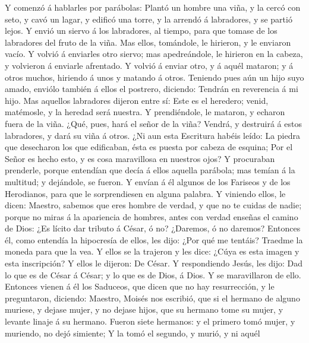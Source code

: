  Y comenzó á hablarles por parábolas: Plantó un hombre una
viña, y la cercó con seto, y cavó un lagar, y edificó una torre, y la
arrendó á labradores, y se partió lejos.  Y envió un
siervo á los labradores, al tiempo, para que tomase de los labradores
del fruto de la viña.  Mas ellos, tomándole, le hirieron,
y le enviaron vacío.  Y volvió á enviarles otro siervo;
mas apedreándole, le hirieron en la cabeza, y volvieron á enviarle
afrentado.  Y volvió á enviar otro, y á aquél mataron; y á
otros muchos, hiriendo á unos y matando á otros.  Teniendo
pues aún un hijo suyo amado, enviólo también á ellos el postrero,
diciendo: Tendrán en reverencia á mi hijo.  Mas aquellos
labradores dijeron entre sí: Este es el heredero; venid, matémosle, y la
heredad será nuestra.  Y prendiéndole, le mataron, y
echaron fuera de la viña.  ¿Qué, pues, hará el señor de la
viña? Vendrá, y destruirá á estos labradores, y dará su viña á otros.
 ¿Ni aun esta Escritura habéis leído: La piedra que
desecharon los que edificaban, ésta es puesta por cabeza de esquina;
 Por el Señor es hecho esto, y es cosa maravillosa en
nuestros ojos?  Y procuraban prenderle, porque entendían
que decía á ellos aquella parábola; mas temían á la multitud; y
dejándole, se fueron.  Y envían á él algunos de los
Fariseos y de los Herodianos, para que le sorprendiesen en alguna
palabra.  Y viniendo ellos, le dicen: Maestro, sabemos
que eres hombre de verdad, y que no te cuidas de nadie; porque no miras
á la apariencia de hombres, antes con verdad enseñas el camino de Dios:
¿Es lícito dar tributo á César, ó no? ¿Daremos, ó no daremos?
 Entonces él, como entendía la hipocresía de ellos, les
dijo: ¿Por qué me tentáis? Traedme la moneda para que la vea.
 Y ellos se la trajeron y les dice: ¿Cúya es esta imagen
y esta inscripción? Y ellos le dijeron: De César.  Y
respondiendo Jesús, les dijo: Dad lo que es de César á César; y lo que
es de Dios, á Dios. Y se maravillaron de ello.  Entonces
vienen á él los Saduceos, que dicen que no hay resurrección, y le
preguntaron, diciendo:  Maestro, Moisés nos escribió, que
si el hermano de alguno muriese, y dejase mujer, y no dejase hijos, que
su hermano tome su mujer, y levante linaje á su hermano. 
Fueron siete hermanos: y el primero tomó mujer, y muriendo, no dejó
simiente;  Y la tomó el segundo, y murió, y ni aquél

